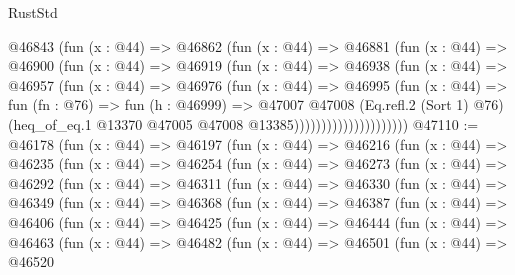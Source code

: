 \begin{lexlean}{RustStd}
\begin{coremodule}
                        @46843
                          (fun (x : @44) =>
                          @46862
                            (fun (x : @44) =>
                            @46881
                              (fun (x : @44) =>
                              @46900
                                (fun (x : @44) =>
                                @46919
                                  (fun (x : @44) =>
                                  @46938
                                    (fun (x : @44) =>
                                    @46957
                                      (fun (x : @44) =>
                                      @46976
                                        (fun (x : @44) =>
                                        @46995
                                          (fun (x : @44) =>
                                          fun (fn : @76) =>
                                          fun (h : @46999) =>
                                          @47007
                                            @47008
                                            (Eq.refl.{2} (Sort 1) @76)
                                            (heq_of_eq.{1}
                                              @13370
                                              @47005
                                              @47008
                                              @13385)))))))))))))))))))))
@47110 := @46178
    (fun (x : @44) =>
    @46197
      (fun (x : @44) =>
      @46216
        (fun (x : @44) =>
        @46235
          (fun (x : @44) =>
          @46254
            (fun (x : @44) =>
            @46273
              (fun (x : @44) =>
              @46292
                (fun (x : @44) =>
                @46311
                  (fun (x : @44) =>
                  @46330
                    (fun (x : @44) =>
                    @46349
                      (fun (x : @44) =>
                      @46368
                        (fun (x : @44) =>
                        @46387
                          (fun (x : @44) =>
                          @46406
                            (fun (x : @44) =>
                            @46425
                              (fun (x : @44) =>
                              @46444
                                (fun (x : @44) =>
                                @46463
                                  (fun (x : @44) =>
                                  @46482
                                    (fun (x : @44) =>
                                    @46501
                                      (fun (x : @44) =>
                                      @46520

\end{coremodule}
\end{lexlean}
